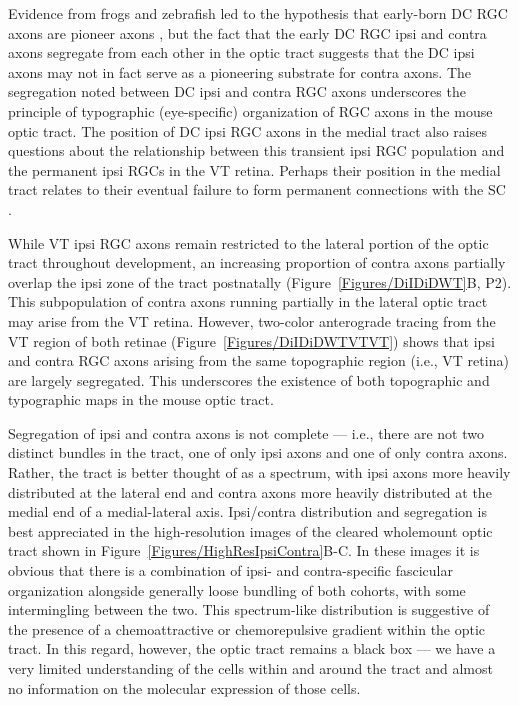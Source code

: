 Evidence from frogs and zebrafish led to the hypothesis that early-born DC RGC axons are pioneer axons \cite{holt1984does,pittman2008pathfinding}, but the fact that the early DC RGC ipsi and contra axons segregate from each other in the optic tract \cite{soares2015transient} suggests that the DC ipsi axons may not in fact serve as a pioneering substrate for contra axons.
The segregation noted between DC ipsi and contra RGC axons underscores the principle of typographic (eye-specific) organization of RGC axons in the mouse optic tract.
The position of DC ipsi RGC axons in the medial tract also raises questions about the relationship between this transient ipsi RGC population and the permanent ipsi RGCs in the VT retina.
Perhaps their position in the medial tract relates to their eventual failure to form permanent connections with the SC \cite{soares2015transient}.

While VT ipsi RGC axons remain restricted to the lateral portion of the optic tract throughout development, an increasing proportion of contra axons partially overlap the ipsi zone of the tract postnatally (Figure~\ref{Figures/DiIDiDWT}B, P2).
This subpopulation of contra axons running partially in the lateral optic tract may arise from the VT retina.
However, two-color anterograde tracing from the VT region of both retinae (Figure~\ref{Figures/DiIDiDWTVTVT}) shows that ipsi and contra RGC axons arising from the same topographic region (i.e., VT retina) are largely segregated.
This underscores the existence of both topographic and typographic maps in the mouse optic tract.

Segregation of ipsi and contra axons is not complete --- i.e., there are not two distinct bundles in the tract, one of only ipsi axons and one of only contra axons.
Rather, the tract is better thought of as a spectrum, with ipsi axons more heavily distributed at the lateral end and contra axons more heavily distributed at the medial end of a medial-lateral axis.
Ipsi/contra distribution and segregation is best appreciated in the high-resolution images of the cleared wholemount optic tract shown in Figure~\ref{Figures/HighResIpsiContra}B-C.
In these images it is obvious that there is a combination of ipsi- and contra-specific fascicular organization alongside generally loose bundling of both cohorts, with some intermingling between the two.
This spectrum-like distribution is suggestive of the presence of a chemoattractive or chemorepulsive gradient within the optic tract.
In this regard, however, the optic tract remains a black box --- we have a very limited understanding of the cells within and around the tract and almost no information on the molecular expression of those cells.

